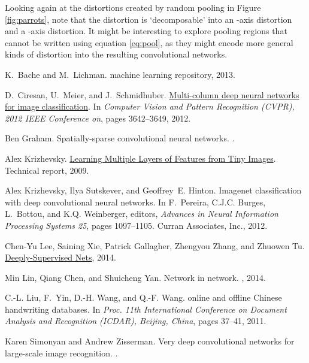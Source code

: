 \documentclass[english]{article}
\begin{document}
Looking again at the distortions created by random pooling in Figure
\ref{fig:parrots}, note that the distortion is `decomposable' into
an -axis distortion and a -axis distortion. It might be interesting
to explore pooling regions that cannot be written using equation \ref{eq:pool},
as they might encode more general kinds of distortion into the resulting
convolutional networks.
\begin{thebibliography}{10}

K.~Bache and M.~Lichman.
 machine learning repository, 2013.

D.~Ciresan, U.~Meier, and J.~Schmidhuber.
\newblock \href{www.idsia.ch/~juergen/cvpr2012.pd}{Multi-column deep neural
  networks for image classification}.
\newblock In {\em Computer Vision and Pattern Recognition (CVPR), 2012 IEEE
  Conference on}, pages 3642--3649, 2012.

Ben Graham.
\newblock Spatially-sparse convolutional neural networks.
.

Alex Krizhevsky.
\newblock \href{http://www.cs.toronto.edu/~kriz/cifar.html}{Learning Multiple
  Layers of Features from Tiny Images}.
\newblock Technical report, 2009.

Alex Krizhevsky, Ilya Sutskever, and Geoffrey~E. Hinton.
\newblock Imagenet classification with deep convolutional neural networks.
\newblock In F.~Pereira, C.J.C. Burges, L.~Bottou, and K.Q. Weinberger,
  editors, {\em Advances in Neural Information Processing Systems 25}, pages
  1097--1105. Curran Associates, Inc., 2012.

Chen-Yu Lee, Saining Xie, Patrick Gallagher, Zhengyou Zhang, and Zhuowen Tu.
\newblock \href{http://arxiv.org/abs/1409.5185}{Deeply-Supervised Nets}, 2014.

Min Lin, Qiang Chen, and Shuicheng Yan.
\newblock Network in network.
, 2014.

C.-L. Liu, F.~Yin, D.-H. Wang, and Q.-F. Wang.
 online and offline {C}hinese handwriting databases.
\newblock In {\em Proc. 11th International Conference on Document Analysis and
  Recognition (ICDAR), Beijing, China}, pages 37--41, 2011.

Karen Simonyan and Andrew Zisserman.
\newblock Very deep convolutional networks for large-scale image recognition.
.


\end{thebibliography}
\end{document}
